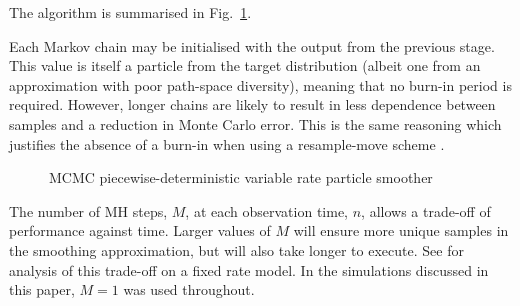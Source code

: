 \documentclass[10pt,twocolumn,twoside]{IEEEtran}
\begin{document}
The algorithm is summarised in Fig.~\ref{alg:VRPS}.

Each Markov chain may be initialised with the output from the previous stage. This value is itself a particle from the target distribution (albeit one from an approximation with poor path-space diversity), meaning that no burn-in period is required. However, longer chains are likely to result in less dependence between samples and a reduction in Monte Carlo error. This is the same reasoning which justifies the absence of a burn-in when using a resample-move scheme \cite{Gilks2001}.

\begin{figure}
\caption{MCMC piecewise-deterministic variable rate particle smoother}
\label{alg:VRPS}
\end{figure}

The number of MH steps, $M$, at each observation time, $n$, allows a trade-off of performance against time. Larger values of $M$ will ensure more unique samples in the smoothing approximation, but will also take longer to execute. See \cite{Bunch2012} for analysis of this trade-off on a fixed rate model. In the simulations discussed in this paper, $M=1$ was used throughout.
\end{document}

